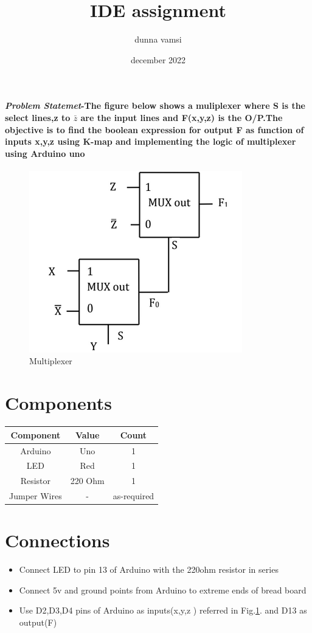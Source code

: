 \documentclass[journal,10pt]{article}
\title{IDE assignment}
\author{dunna vamsi}
\date{december 2022}
\begin{document}
\maketitle

\paragraph{\textit{Problem Statemet}-The figure below shows a muliplexer where S is the select lines,z to $\bar{z}$ are the input lines and F(x,y,z) is the O/P.The objective is to find the boolean expression for output F as function of inputs x,y,z using K-map and implementing the logic of multiplexer using Arduino uno}
\bigskip

\begin{figure}[!h]
\centering
\includegraphics[scale=0.2]{ide.png}
\caption{Multiplexer}
\label{fig:mux}
\end{figure}
\bigskip

\section{ Components}
{
\centering
\begin{tabular}{|c|c|c|}
\hline
Component&Value&Count\\
\hline
Arduino &Uno& 1\\
\hline
LED & Red &1\\
\hline
Resistor&220 Ohm&1\\
\hline
Jumper Wires&-&as-required\\
\hline
\end{tabular}
}

\section{Connections}
\begin{itemize}
\item Connect LED to pin 13 of Arduino with the 220ohm resistor in series
\item Connect 5v and ground points from Arduino to extreme ends of bread board
\item Use D2,D3,D4 pins of Arduino as inputs(x,y,z ) referred in Fig.\ref{fig:mux}.  and D13 as output(F)
\end{itemize}
\end{document}
